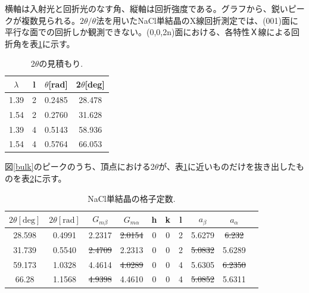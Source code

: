 \documentclass[11pt,a4j,uplatex]{jsarticle}
\begin{document}
横軸は入射光と回折光のなす角、縦軸は回折強度である。グラフから、鋭いピークが複数見られる。$2\theta/\theta$法を用いたNaCl単結晶のX線回折測定では、(001)面に平行な面での回折しか観測できない。(0,0,2n)面における、各特性Ｘ線による回折角を表\ref{gyakusan}に示す。

\begin{table}[htbp]
 \begin{center}
  \caption{2$\theta$の見積もり.}
  \begin{tabular}{|c|c|c|c|}\hline
    $\lambda$ & l      & $\theta$[rad] & 2$\theta$[deg] \\  \hline  \hline
   1.39 & 2         & 0.2485 & 28.478                         \\
   1.54 & 2         & 0.2760 & 31.628                         \\
   1.39 & 4         & 0.5143 & 58.936                         \\
         1.54      & 4      & 0.5764        & 66.053         \\
   \hline
  \end{tabular}
  \label{gyakusan}
 \end{center}
\end{table}

\newpage
図\ref{bulk}のピークのうち、頂点における2$\theta$が、表\ref{gyakusan}に近いものだけを抜き出したものを表\ref{crystal}に示す。

\begin{table}[htbp]
 \begin{center}
  \caption{NaCl単結晶の格子定数.}
  \begin{tabular}{|c|c|c|c|ccc|c|c|c|}  \hline
   $2\theta[\mathrm{deg}]$ & $2\theta[\mathrm{rad}]$ & $G_{m\beta}$  & $G_{m\alpha}$ & h & k & l & $a_\beta$     & $a_\alpha$    \\   \hline  \hline
   28.598                  & 0.4991                  & 2.2317        & \sout{2.0154} & 0 & 0 & 2 & 5.6279        & \sout{6.232}  \\
   31.739                  & 0.5540                  & \sout{2.4709} & 2.2313        & 0 & 0 & 2 & \sout{5.0832} & 5.6289        \\
   59.173                  & 1.0328                  & 4.4614        & \sout{4.0289} & 0 & 0 & 4 & 5.6305        & \sout{6.2350} \\
   66.28                   & 1.1568                  & \sout{4.9398} & 4.4610        & 0 & 0 & 4 & \sout{5.0852} & 5.6311        \\
   \hline
  \end{tabular}
  \label{crystal}
 \end{center}
\end{table}
\end{document}
